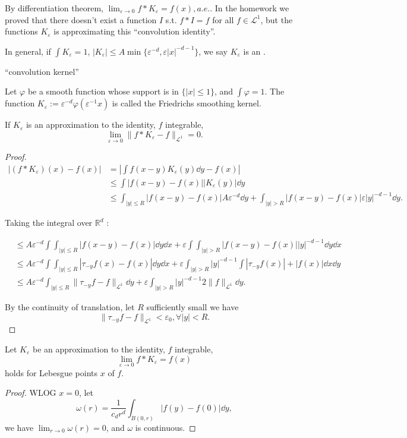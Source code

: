 By differentiation theorem, $\lim_{\varepsilon\to 0}f*K_\varepsilon = f(x), a.e.$.
In the homework we proved that there doesn't exist a function $I$ s.t.
$f*I=f$ for all $f\in \mathcal{L}^1$, but the functions $K_\varepsilon$
is approximating this ``convolution identity''.

\begin{definition}
	In general, if $\int K_\varepsilon =1$,
	$|K_\varepsilon|\le A\min\{\varepsilon^{-d},\varepsilon |x|^{-d-1}\}$,
	we say $K_\varepsilon$ is an .
\end{definition}

``convolution kernel''

Let $\varphi$ be a smooth function whose support is in  $\{|x|\le 1\}$,
and $\int \varphi = 1$.
The function  $K_\varepsilon := \varepsilon^{-d}\varphi(\varepsilon^{-1}x)$
is called the Friedrichs smoothing kernel.

\begin{theorem}
    If $K_\varepsilon$ is an approximation to the identity, $f$ integrable,
	\[
	\lim_{\varepsilon \to 0} \lVert f*K_\varepsilon - f \rVert _{\mathcal{L}^1} = 0.
	\]
\end{theorem}
\begin{proof}[Proof]
    \begin{align*}
        |(f*K_\varepsilon)(x) - f(x)|
		&= \left|\int f(x-y)K_\varepsilon(y)\dd y - f(x)\right|\\
		&\le \int |f(x-y)-f(x)| |K_\varepsilon(y)|\dd y\\
		&\le \int _{|y|\le R} |f(x-y)-f(x)| A\varepsilon^{-d}\dd y
		+ \int _{|y|>R} |f(x-y)-f(x)| \varepsilon |y|^{-d-1}\dd y.
    \end{align*}

	Taking the integral over $\mathbb{R}^d$ :

	\begin{align*}
		&\le A\varepsilon^{-d} \int \int_{|y|\le R} |f(x-y)-f(x)|\dd y \dd x
		+\varepsilon\int \int_{|y|>R} |f(x-y)-f(x)||y|^{-d-1}\dd y\dd x\\
		&\le A\varepsilon^{-d} \int\int_{|y|\le R}|\tau_{-y}f(x)-f(x)|\dd y\dd x
		+ \varepsilon \int_{|y|>R}|y|^{-d-1}\int |\tau_{-y}f(x)|+|f(x)|\dd x\dd y\\
		&\le A\varepsilon^{-d}\int_{|y|\le R}\lVert \tau_{-y}f-f \rVert _{\mathcal{L}^1}
		\dd y + \varepsilon \int_{|y|>R} |y|^{-d-1} 2\lVert f \rVert _{\mathcal{L}^1}\dd y.
	\end{align*}

	By the continuity of translation, let $R$ sufficiently small we have
	\[
	\lVert \tau_{-y}f-f \rVert _{\mathcal{L}^1} < \varepsilon_0, \forall|y|<R.
	\]
\end{proof}

\begin{theorem}
    Let $K_\varepsilon$ be an approximation to the identity, $f$ integrable,
	\[
	\lim_{\varepsilon\to 0} f*K_\varepsilon = f(x)
	\]
	holds for Lebesgue points $x$ of $f$.
\end{theorem}
\begin{proof}[Proof]
    WLOG $x=0$, let
	\[
	\omega(r) = \frac{1}{c_d r^d}\int_{B(0,r)} |f(y)-f(0)| \dd y,
	\]
	we have  $\lim_{r\to 0}\omega(r) = 0$, and $\omega$ is continuous.
\end{proof}
